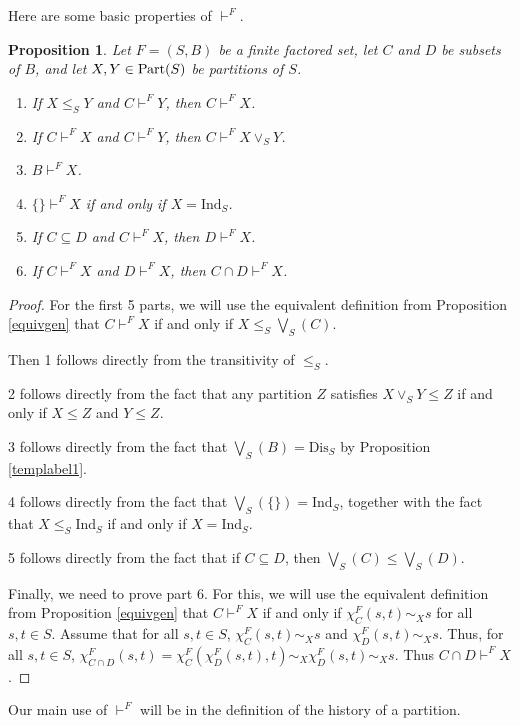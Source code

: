 \documentclass[authordate,onecolumn]{miri-tech-article}
\newtheorem{proposition}{Proposition}
\begin{document}
Here are some basic properties of $\vdash^F$.
\begin{proposition}\label{propgen}
Let $F=(S,B)$ be a finite factored set, let $C$ and $D$ be subsets of $B$, and let $X,Y\in \text{Part}(S)$ be partitions of $S$.
\begin{enumerate}
    \item If $X\leq_S Y$ and $C\vdash^F Y$, then $C\vdash^F X$.
    \item If $C\vdash^F X$ and $C\vdash^F Y$, then $C\vdash^F X\vee_S Y$.
    \item $B\vdash^F X$.
    \item $\{\}\vdash^F X$ if and only if $X=\text{Ind}_S$.
    \item If $C\subseteq D$ and $C\vdash^F X$, then $D\vdash^F X$.
    \item If $C\vdash^F X$ and $D\vdash^F X$, then $C\cap D\vdash^F X$.
\end{enumerate}
\end{proposition}
\begin{proof}
For the first 5 parts, we will use the equivalent definition from Proposition \ref{equivgen} that $C\vdash^F X$ if and only if $X\leq_S\bigvee_S(C)$.

Then 1 follows directly from the transitivity of $\leq_S$.

2 follows directly from the fact that any partition $Z$ satisfies $X\vee_S Y\leq Z$ if and only if $X\leq Z$ and $Y\leq Z$.

3 follows directly from the fact that $\bigvee_S(B)=\text{Dis}_S$ by Proposition \ref{templabel1}.

4 follows directly from the fact that $\bigvee_S(\{\})=\text{Ind}_S$, together with the fact that $X\leq_S \text{Ind}_S$ if and only if $X=\text{Ind}_S$.

5 follows directly from the fact that if $C\subseteq D$, then $\bigvee_S(C)\leq \bigvee_S(D)$.

Finally, we need to prove part 6. For this, we will use the equivalent definition from Proposition \ref{equivgen} that $C\vdash^F X$ if and only if $\chi^F_C(s,t)\sim_X s$ for all $s,t\in S$. Assume that for all $s,t\in S$, $\chi^F_C(s,t)\sim_X s$ and $\chi^F_D(s,t)\sim_X s$. Thus, for all $s,t\in S$, $\chi^F_{C\cap D}(s,t)=\chi^F_C(\chi^F_D(s,t),t)\sim_X\chi^F_D(s,t)\sim_X s$. Thus $C\cap D\vdash^F X$.
\end{proof}
Our main use of $\vdash^F$ will be in the definition of the history of a partition.
\end{document}
